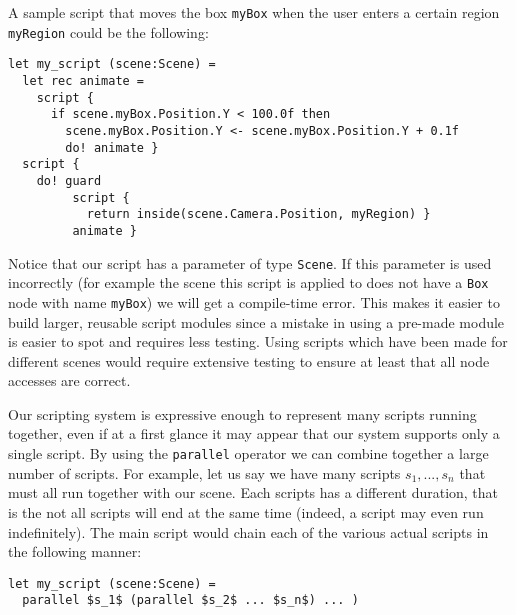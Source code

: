 A sample script that moves the box \texttt{myBox} when the user enters a certain region \texttt{myRegion} could be the following:

\begin{lstlisting}
let my_script (scene:Scene) =
  let rec animate =
    script {
      if scene.myBox.Position.Y < 100.0f then
        scene.myBox.Position.Y <- scene.myBox.Position.Y + 0.1f
        do! animate }
  script {
    do! guard
         script {
           return inside(scene.Camera.Position, myRegion) }
         animate }
\end{lstlisting}

Notice that our script has a parameter of type \texttt{Scene}. If this parameter is used incorrectly (for example the scene this script is applied to does not have a \texttt{Box} node with name \texttt{myBox}) we will get a compile-time error. This makes it easier to build larger, reusable script modules since a mistake in using a pre-made module is easier to spot and requires less testing. Using scripts which have been made for different scenes would require extensive testing to ensure at least that all node accesses are correct.

Our scripting system is expressive enough to represent many scripts running together, even if at a first glance it may appear that our system supports only a single script. By using the \texttt{parallel} operator we can combine together a large number of scripts. For example, let us say we have many scripts $s_1, ... , s_n$ that must all run together with our scene. Each scripts has a different duration, that is the not all scripts will end at the same time (indeed, a script may even run indefinitely). The main script would chain each of the various actual scripts in the following manner:

\begin{lstlisting}
let my_script (scene:Scene) =
  parallel $s_1$ (parallel $s_2$ ... $s_n$) ... )
\end{lstlisting}
